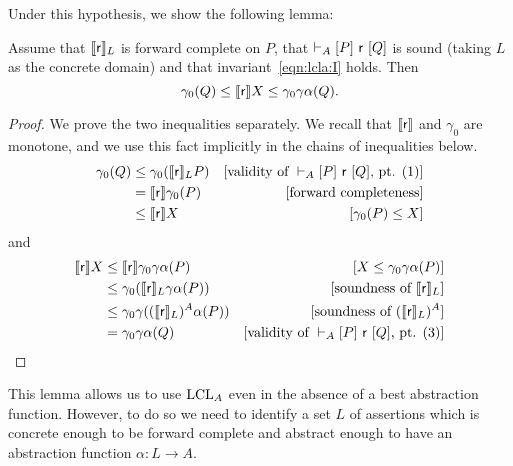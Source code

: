 Under this hypothesis, we show the following lemma:

\begin{prop}
	Assume that $\llbracket\mathsf{r}\rrbracket_L$ is forward complete on $P$, that $\vdash_{A}\nobreak[P]~\mathsf{r}~[Q]$ is sound (taking $L$ as the concrete domain) and that invariant~\eqref{eqn:lcla:I} holds.
	Then 
	\[
	\gamma_0(Q) \le \llbracket\mathsf{r}\rrbracket X \le \gamma_0\gamma\alpha(Q) \text{.}
	\]
\end{prop}
\begin{proof}
	We prove the two inequalities separately. We recall that $\llbracket\mathsf{r}\rrbracket$ and $\gamma_0$ are monotone, and we use this fact implicitly in the chains of inequalities below.
	\begin{align*}
		\gamma_0 (Q) &\le \gamma_0 (\llbracket\mathsf{r}\rrbracket_L P) &[\text{validity of }\vdash_{A}\nobreak[P]~\mathsf{r}~[Q]\text{, pt. (1)}] \\
		&= \llbracket\mathsf{r}\rrbracket \gamma_0(P) &[\text{forward completeness}] \\
		&\le \llbracket\mathsf{r}\rrbracket X &[\gamma_0(P) \le X]
	\end{align*}
	and
	\begin{align*}
		\llbracket\mathsf{r}\rrbracket X &\le \llbracket\mathsf{r}\rrbracket \gamma_0 \gamma \alpha(P) &[X \le \gamma_0 \gamma \alpha(P)] \\
		&\le \gamma_0 (\llbracket\mathsf{r}\rrbracket_L \gamma\alpha(P)) &[\text{soundness of }\llbracket\mathsf{r}\rrbracket_L] \\
		&\le \gamma_0 \gamma ((\llbracket\mathsf{r}\rrbracket_L)^A \alpha(P)) &[\text{soundness of }(\llbracket\mathsf{r}\rrbracket_L)^A] \\
		&= \gamma_0 \gamma \alpha(Q) &[\text{validity of }\vdash_{A}\nobreak[P]~\mathsf{r}~[Q]\text{, pt. (3)}]
	\end{align*}
\end{proof}

This lemma allows us to use $\text{LCL}_A$ even in the absence of a best abstraction function. However, to do so we need to identify a set $L$ of assertions which is concrete enough to be forward complete and abstract enough to have an abstraction function $\alpha: L \rightarrow A$.


